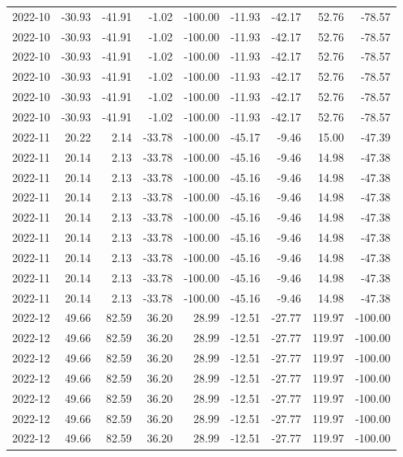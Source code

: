 \begin{table}[ht]
\begin{tabular}{lrrrrrrrr}
  2022-10 & -30.93 & -41.91 & -1.02 & -100.00 & -11.93 & -42.17 & 52.76 & -78.57 \\ 
  2022-10 & -30.93 & -41.91 & -1.02 & -100.00 & -11.93 & -42.17 & 52.76 & -78.57 \\ 
  2022-10 & -30.93 & -41.91 & -1.02 & -100.00 & -11.93 & -42.17 & 52.76 & -78.57 \\ 
  2022-10 & -30.93 & -41.91 & -1.02 & -100.00 & -11.93 & -42.17 & 52.76 & -78.57 \\ 
  2022-10 & -30.93 & -41.91 & -1.02 & -100.00 & -11.93 & -42.17 & 52.76 & -78.57 \\ 
  2022-10 & -30.93 & -41.91 & -1.02 & -100.00 & -11.93 & -42.17 & 52.76 & -78.57 \\ 
  2022-11 & 20.22 & 2.14 & -33.78 & -100.00 & -45.17 & -9.46 & 15.00 & -47.39 \\ 
  2022-11 & 20.14 & 2.13 & -33.78 & -100.00 & -45.16 & -9.46 & 14.98 & -47.38 \\ 
  2022-11 & 20.14 & 2.13 & -33.78 & -100.00 & -45.16 & -9.46 & 14.98 & -47.38 \\ 
  2022-11 & 20.14 & 2.13 & -33.78 & -100.00 & -45.16 & -9.46 & 14.98 & -47.38 \\ 
  2022-11 & 20.14 & 2.13 & -33.78 & -100.00 & -45.16 & -9.46 & 14.98 & -47.38 \\ 
  2022-11 & 20.14 & 2.13 & -33.78 & -100.00 & -45.16 & -9.46 & 14.98 & -47.38 \\ 
  2022-11 & 20.14 & 2.13 & -33.78 & -100.00 & -45.16 & -9.46 & 14.98 & -47.38 \\ 
  2022-11 & 20.14 & 2.13 & -33.78 & -100.00 & -45.16 & -9.46 & 14.98 & -47.38 \\ 
  2022-11 & 20.14 & 2.13 & -33.78 & -100.00 & -45.16 & -9.46 & 14.98 & -47.38 \\ 
  2022-12 & 49.66 & 82.59 & 36.20 & 28.99 & -12.51 & -27.77 & 119.97 & -100.00 \\ 
  2022-12 & 49.66 & 82.59 & 36.20 & 28.99 & -12.51 & -27.77 & 119.97 & -100.00 \\ 
  2022-12 & 49.66 & 82.59 & 36.20 & 28.99 & -12.51 & -27.77 & 119.97 & -100.00 \\ 
  2022-12 & 49.66 & 82.59 & 36.20 & 28.99 & -12.51 & -27.77 & 119.97 & -100.00 \\ 
  2022-12 & 49.66 & 82.59 & 36.20 & 28.99 & -12.51 & -27.77 & 119.97 & -100.00 \\ 
  2022-12 & 49.66 & 82.59 & 36.20 & 28.99 & -12.51 & -27.77 & 119.97 & -100.00 \\ 
  2022-12 & 49.66 & 82.59 & 36.20 & 28.99 & -12.51 & -27.77 & 119.97 & -100.00 \\ 

\end{tabular}
\end{table}
